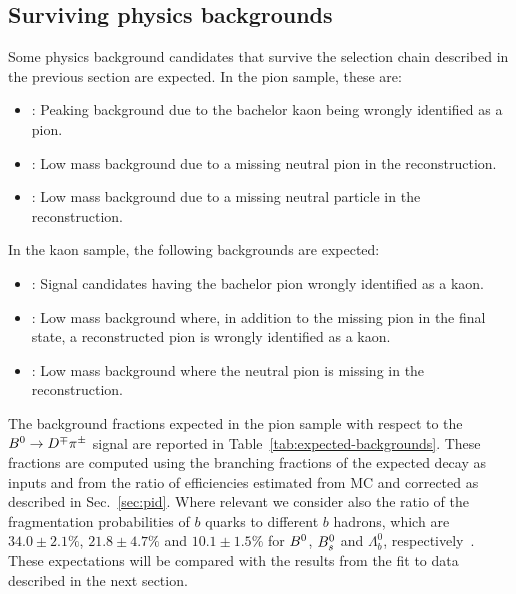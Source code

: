 \subsection{Surviving physics backgrounds}

Some physics background candidates that survive the selection chain described in
the previous section are expected. In the pion sample, these are:
%
\begin{itemize}[noitemsep,topsep=0pt]
	\item {}: Peaking background due to the bachelor kaon being wrongly identified as a pion.
	\item {}: Low mass background due to a missing neutral pion in the reconstruction.
	\item {}: Low mass background due to a missing neutral particle in the reconstruction.
\end{itemize}
%
In the kaon sample, the following backgrounds are expected:
%
\begin{itemize}[noitemsep,topsep=0pt]
	\item {}:
		Signal candidates having the bachelor pion wrongly identified as a kaon.
	\item {}:
		Low mass background where, in addition to the missing pion in the final state, a reconstructed pion is
		wrongly identified as a kaon.
	\item {}:
		Low mass background where the neutral pion is missing in the reconstruction.
\end{itemize}
%
The background fractions expected in the pion sample with respect to the
$B^0\rightarrow D^\mp\pi^\pm$ signal are reported in Table~\ref{tab:expected-backgrounds}. These
fractions are computed using the branching fractions of the expected decay as
inputs and from the ratio of efficiencies estimated from MC and corrected as described in Sec.~\ref{sec:pid}. Where
relevant we consider also the ratio of the fragmentation probabilities of $b$
quarks to different $b$ hadrons, which are $34.0\pm2.1\%$, $21.8\pm4.7\%$ and $10.1\pm1.5\%$ 
for $B^0$, $B^0_s$ and $\Lambda^0_b$, respectively~\cite{HFLAV16}. 
These expectations will be compared with the
results from the fit to data described in the next section.
